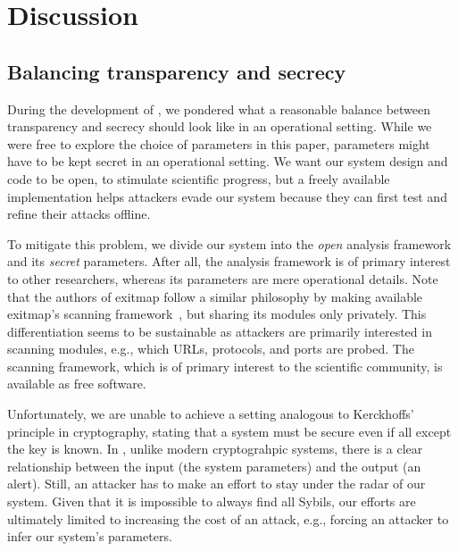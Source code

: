 \section{Discussion}
\label{sec:discussion}

\subsection{Balancing transparency and secrecy}
\label{sec:secrecy}
% 
% 
During the development of \sys, we pondered what a reasonable balance
between transparency and secrecy should look like in an operational setting.
While we were free to explore the choice of \sys parameters in this
paper, parameters might have to be kept secret in an operational setting.  We
want our system design and code to be open, to stimulate scientific progress,
but a freely available implementation helps attackers evade our system because
they can first test and refine their attacks offline.

To mitigate this problem, we divide our system into the \emph{open} analysis
framework and its \emph{secret} parameters.  After all, the analysis framework
is of primary interest to other researchers, whereas its parameters are mere
operational details.  Note that the authors of exitmap follow a similar
philosophy by making available exitmap's scanning framework~\cite{exitmap}, but
sharing its modules only privately.  This differentiation seems to be
sustainable as attackers are primarily interested in scanning modules, e.g.,
which URLs, protocols, and ports are probed.  The scanning framework, which is
of primary interest to the scientific community, is available as free software.

Unfortunately, we are unable to achieve a setting analogous to Kerckhoffs'
principle in cryptography, stating that a system must be secure even if all
except the key is known.  In \sys, unlike modern cryptograhpic systems,
there is a clear relationship between the input (the system parameters) and the
output (an alert).  Still, an attacker has to make an effort to stay under the
radar of our system.  Given that it is impossible to always find all Sybils, our
efforts are ultimately limited to increasing the cost of an attack, e.g.,
forcing an attacker to infer our system's parameters.

